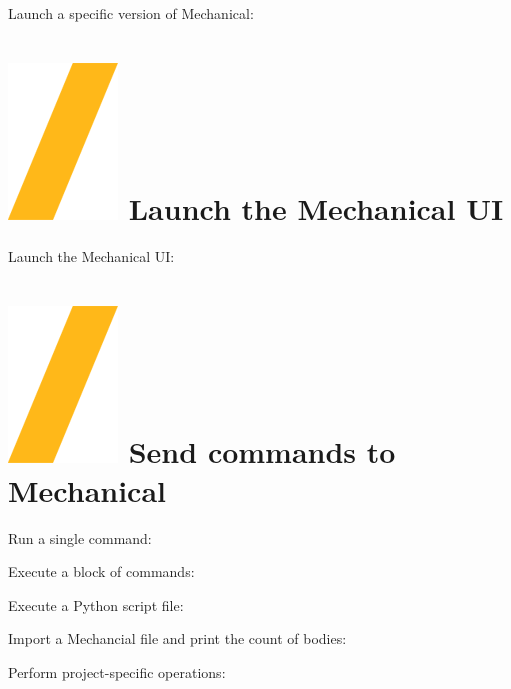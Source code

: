 \documentclass[9pt,landscape]{article}
\begin{document}
\begin{multicols}{3}
Launch a specific version of Mechanical:

\section{\includegraphics[height=\fontcharht\font`\S]{slash.png} Launch the  Mechanical UI}
Launch the  Mechanical UI:



\vfill
\section{\includegraphics[height=\fontcharht\font`\S]{slash.png} Send commands to Mechanical}
Run a single command:

Execute a block of commands:

Execute a Python script file:

Import a Mechancial file and print the count of bodies:

Perform project-specific operations:


\end{multicols}
\end{document}
